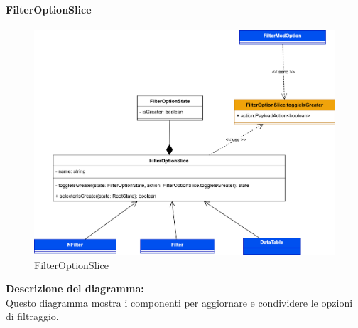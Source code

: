 \paragraph{FilterOptionSlice}
\begin{figure}[h!] \centering
    \includegraphics[scale=0.18]{template/images/uml_front/logic/FilterOptionSlice.png}
    \caption{FilterOptionSlice}
\end{figure}
\textbf{Descrizione del diagramma:}\\
Questo diagramma mostra i componenti per aggiornare e condividere le opzioni di filtraggio.
